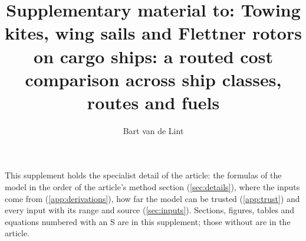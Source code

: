 \documentclass[3p,times,authoryear]{elsarticle}
\begin{document}
\fidelitynote

\begin{frontmatter}

\title{Supplementary material to: Towing kites, wing sails and Flettner rotors on cargo ships: a routed cost comparison across ship classes, routes and fuels\\[1ex]{\normalsize\normalfont\itshape\confidential}}

\author{Bart van de Lint}
\author{}
\author{}

\end{frontmatter}

This supplement holds the specialist detail of the article: the formulas of the model in the order of the article's method section (\cref{sec:details}), where the inputs come from (\cref{app:derivations}), how far the model can be trusted (\cref{app:trust}) and every input with its range and source (\cref{sec:inputs}). Sections, figures, tables and equations numbered with an S are in this supplement; those without are in the article.








\end{document}

